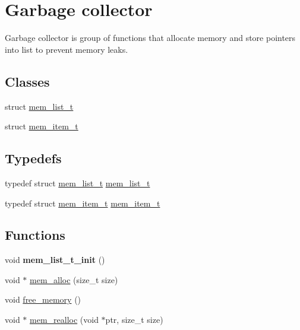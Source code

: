 \hypertarget{group__garbage__collector}{}\section{Garbage collector}
\label{group__garbage__collector}


Garbage collector is group of functions that allocate memory and store pointers into list to prevent memory leaks.  


\subsection*{Classes}
\begin{DoxyCompactItemize}
\item 
struct \hyperlink{structmem__list__t}{mem\+\_\+list\+\_\+t}
\item 
struct \hyperlink{structmem__item__t}{mem\+\_\+item\+\_\+t}
\end{DoxyCompactItemize}
\subsection*{Typedefs}
\begin{DoxyCompactItemize}
\item 
typedef struct \hyperlink{structmem__list__t}{mem\+\_\+list\+\_\+t} \hyperlink{group__garbage__collector_ga36b1703faf3c854ab706e2d1565d0675}{mem\+\_\+list\+\_\+t}
\item 
typedef struct \hyperlink{structmem__item__t}{mem\+\_\+item\+\_\+t} \hyperlink{group__garbage__collector_ga45f8d443bc7a0cc8c6fd0c12d59626b0}{mem\+\_\+item\+\_\+t}
\end{DoxyCompactItemize}
\subsection*{Functions}
\begin{DoxyCompactItemize}
\item 
void {\bfseries mem\+\_\+list\+\_\+t\+\_\+init} ()\hypertarget{group__garbage__collector_ga6fbe32445893d321b600470e950ee540}{}\label{group__garbage__collector_ga6fbe32445893d321b600470e950ee540}

\item 
void $\ast$ \hyperlink{group__garbage__collector_gafc112ff977fb81bd172f5bb58bbcf19a}{mem\+\_\+alloc} (size\+\_\+t size)
\item 
void \hyperlink{group__garbage__collector_ga9f81a9a3690fcba7180fa860e0c2422f}{free\+\_\+memory} ()
\item 
void $\ast$ \hyperlink{group__garbage__collector_ga5f27a409c8a3e15b2288de524163687b}{mem\+\_\+realloc} (void $\ast$ptr, size\+\_\+t size)
\end{DoxyCompactItemize}
